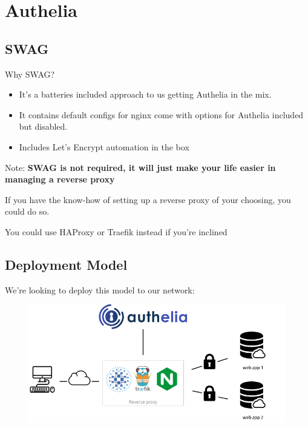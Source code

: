 \documentclass{beamer}
\begin{document}
\section{Authelia}
\subsection{SWAG}

\begin{frame}
    \begin{center}
        Why SWAG?
    \end{center}
    \begin{itemize}
        \item It's a batteries included approach to us getting Authelia in the mix.
        \item It contains default configs for nginx come with options for Authelia included but disabled.
        \item Includes Let's Encrypt automation in the box 
    \end{itemize}
\end{frame}

\begin{frame}
    \begin{center}
        Note: \textbf{SWAG is not required, it will just make your life easier in managing a reverse proxy}
        \vspace{5mm}\par\noindent
        If you have the know-how of setting up a reverse proxy of your choosing, you could do so. 
        \vspace{5mm}\par\noindent
        You could use HAProxy or Traefik instead if you're inclined
    \end{center}
\end{frame}

\subsection{Deployment Model}

\begin{frame}
    We're looking to deploy this model to our network:
    \begin{figure}
        \centering
        \includegraphics[width=\textwidth,keepaspectratio]{../resources/archi.png}
    \end{figure}
\end{frame}
\end{document}
